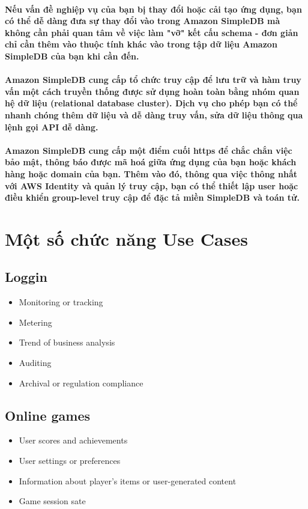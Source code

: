 			\paragraph{Nếu vấn đề nghiệp vụ của bạn bị thay đổi hoặc cải tạo ứng dụng, bạn có thể dễ dàng đưa sự thay đổi vào trong Amazon SimpleDB mà không cần phải quan tâm về việc làm "vỡ" kết cấu schema - đơn giản chỉ cần thêm vào thuộc tính khác vào trong tập dữ liệu Amazon SimpleDB của bạn khi cần đến. }	
			\paragraph{Amazon SimpleDB cung cấp tổ chức truy cập để lưu trữ và hàm truy vấn một cách truyền thống được sử dụng hoàn toàn bằng nhóm quan hệ dữ liệu (relational database cluster). Dịch vụ cho phép bạn có thể nhanh chóng thêm dữ liệu và dễ dàng truy vấn, sửa dữ liệu thông qua lệnh gọi API dễ dàng. }
			\paragraph{Amazon SimpleDB cung cấp một điểm cuối https để chắc chắn việc bảo mật, thông báo được mã hoá giữa ứng dụng của bạn hoặc khách hàng hoặc domain của bạn. Thêm vào đó, thông qua việc thông nhất với AWS Identity và quản lý truy cập, bạn có thể thiết lập user hoặc điều khiển group-level truy cập để đặc tả miền SimpleDB và toán tử.  }
\section{Một số chức năng Use Cases}
	\subsection{Loggin}
		\begin{itemize}
			\item Monitoring or tracking
			\item Metering
			\item Trend of business analysis
			\item Auditing
			\item Archival or regulation compliance
		\end{itemize}
	\subsection{Online games}
		\begin{itemize}
			\item User scores and achievements
			\item User settings or preferences
			\item Information about player's items or user-generated content
			\item Game session sate
		\end{itemize}
